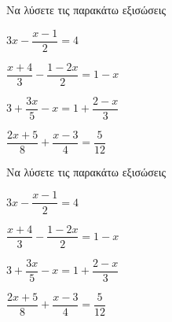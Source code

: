 Να λύσετε τις παρακάτω εξισώσεις
\begin{alist}
\item $ 3x-\dfrac{x-1}{2}=4 $
\item $ \dfrac{x+4}{3}-\dfrac{1-2x}{2}=1-x $
\item $ 3+\dfrac{3x}{5}-x=1+\dfrac{2-x}{3} $
\item $ \dfrac{2x+5}{8}+\dfrac{x-3}{4}=\dfrac{5}{12} $
\end{alist}
Να λύσετε τις παρακάτω εξισώσεις
\begin{alist}
\item $ 3x-\dfrac{x-1}{2}=4 $
\item $ \dfrac{x+4}{3}-\dfrac{1-2x}{2}=1-x $
\item $ 3+\dfrac{3x}{5}-x=1+\dfrac{2-x}{3} $
\item $ \dfrac{2x+5}{8}+\dfrac{x-3}{4}=\dfrac{5}{12} $
\end{alist}
